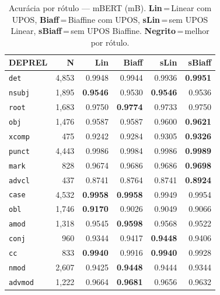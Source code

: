 

\begin{table}[ht]
\centering\scriptsize
\setlength{\tabcolsep}{3pt}
\caption{Acurácia por rótulo --- mBERT (mB). \textbf{Lin}\,=\,Linear com UPOS, \textbf{Biaff}\,=\,Biaffine com UPOS, \textbf{sLin}\,=\,sem UPOS Linear, \textbf{sBiaff}\,=\,sem UPOS Biaffine. \textbf{Negrito}\,=\,melhor por rótulo.}
\label{tab:acc-mbert}
\begin{minipage}[t]{0.60\linewidth}
\centering
\begin{tabular}{l r  r r r r}
\toprule
\textbf{DEPREL} & \textbf{N} & \textbf{Lin} & \textbf{Biaff} & \textbf{sLin} & \textbf{sBiaff} \\
\midrule
\texttt{det} & 4,853 & 0.9948 & 0.9944 & 0.9936 & \textbf{0.9951} \\
\texttt{nsubj} & 1,895 & \textbf{0.9546} & 0.9530 & \textbf{0.9546} & 0.9536 \\
\texttt{root} & 1,683 & 0.9750 & \textbf{0.9774} & 0.9733 & 0.9750 \\
\texttt{obj} & 1,476 & 0.9587 & 0.9587 & 0.9600 & \textbf{0.9621} \\
\texttt{xcomp} & 475 & 0.9242 & 0.9284 & 0.9305 & \textbf{0.9326} \\
\texttt{punct} & 4,443 & 0.9986 & 0.9984 & 0.9986 & \textbf{0.9989} \\
\texttt{mark} & 828 & 0.9674 & 0.9686 & 0.9686 & \textbf{0.9698} \\
\texttt{advcl} & 437 & 0.8741 & 0.8764 & 0.8741 & \textbf{0.8924} \\
\texttt{case} & 4,532 & \textbf{0.9958} & \textbf{0.9958} & 0.9949 & 0.9954 \\
\texttt{obl} & 1,746 & \textbf{0.9170} & 0.9026 & 0.9049 & 0.9066 \\
\texttt{amod} & 1,318 & 0.9545 & \textbf{0.9598} & 0.9568 & 0.9522 \\
\texttt{conj} & 960 & 0.9344 & 0.9417 & \textbf{0.9448} & 0.9406 \\
\texttt{cc} & 833 & \textbf{0.9940} & 0.9916 & \textbf{0.9940} & 0.9928 \\
\texttt{nmod} & 2,607 & 0.9425 & \textbf{0.9448} & 0.9444 & 0.9344 \\
\texttt{advmod} & 1,222 & 0.9664 & \textbf{0.9681} & 0.9656 & 0.9632 \\

\end{tabular}
\end{minipage}
\end{table}
